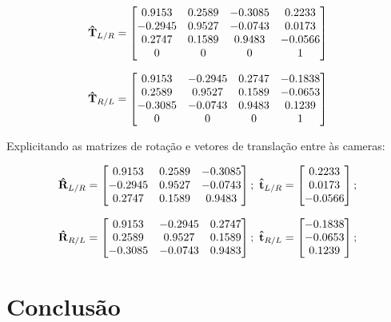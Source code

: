 \begin{equation}\label{eq:tfL2R}
	\mathbf{\hat{T}}_{L/R} = \begin{bmatrix}
		0.9153  & 0.2589 & -0.3085 & 0.2233  \\
		-0.2945 & 0.9527 & -0.0743 & 0.0173  \\
		0.2747  & 0.1589 & 0.9483  & -0.0566 \\
		0       & 0      & 0       & 1   
	\end{bmatrix}
\end{equation}

\begin{equation}\label{eq:tfR2L}
	\mathbf{\hat{T}}_{R/L} = \begin{bmatrix}
		0.9153  & -0.2945 & 0.2747 & -0.1838 \\
		0.2589  & 0.9527  & 0.1589 & -0.0653 \\
		-0.3085 & -0.0743 & 0.9483 & 0.1239  \\
		0       & 0       & 0      & 1
	\end{bmatrix}
\end{equation}

Explicitando as matrizes de rotação e vetores de translação entre às cameras:

\begin{gather}
	\mathbf{\hat{R}}_{L/R} = \begin{bmatrix}
		0.9153  & 0.2589 & -0.3085 \\
		-0.2945 & 0.9527 & -0.0743 \\
		0.2747  & 0.1589 & 0.9483 
	\end{bmatrix}; \ \mathbf{\hat{t}}_{L/R} = \begin{bmatrix}
		0.2233 \\
		0.0173 \\
		-0.0566
	\end{bmatrix};
\end{gather}

\begin{gather}
\mathbf{\hat{R}}_{R/L} = \begin{bmatrix}
	0.9153  & -0.2945 & 0.2747 \\
	0.2589  & 0.9527  & 0.1589 \\
	-0.3085 & -0.0743 & 0.9483
\end{bmatrix}; \ \mathbf{\hat{t}}_{R/L} = \begin{bmatrix}
	-0.1838 \\
	-0.0653 \\
	0.1239
\end{bmatrix}; 
\end{gather}

\clearpage
\section{Conclusão}
